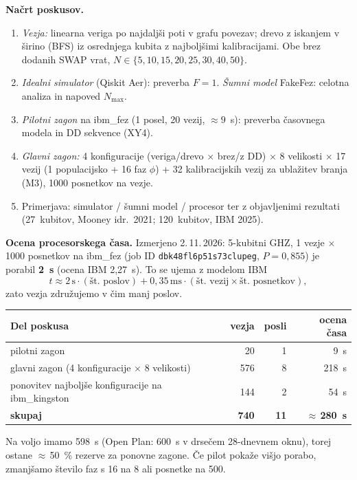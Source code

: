 \documentclass[10pt,a4paper]{article}
\begin{document}
\textbf{Načrt poskusov.}
\begin{enumerate}
\item \emph{Vezja:} linearna veriga po najdaljši poti v grafu povezav; drevo z iskanjem v širino (BFS) iz osrednjega kubita
      z najboljšimi kalibracijami. Obe brez dodanih SWAP vrat, $N\in\{5,10,15,20,25,30,40,50\}$.
\item \emph{Idealni simulator} (Qiskit Aer): preverba $F=1$. \emph{Šumni model} FakeFez: celotna analiza in napoved $N_{\max}$.
\item \emph{Pilotni zagon} na ibm\_fez (1 posel, 20 vezij, $\approx 9$~s): preverba časovnega modela in DD sekvence (XY4).
\item \emph{Glavni zagon:} 4 konfiguracije (veriga/drevo $\times$ brez/z DD) $\times$ 8 velikosti $\times$ 17 vezij
      (1 populacijsko + 16 faz $\phi$) + 32 kalibracijskih vezij za ublažitev branja (M3), 1000 posnetkov na vezje.
\item Primerjava: simulator / šumni model / procesor ter z objavljenimi rezultati (27~kubitov, Mooney idr.\ 2021; 120~kubitov, IBM 2025).
\end{enumerate}

\textbf{Ocena procesorskega časa.} Izmerjeno 2.\,11.\,2026: 5-kubitni GHZ, 1 vezje $\times$ 1000 posnetkov na ibm\_fez
(job ID \texttt{dbk48fl6p51s73clupeg}, $P=0{,}855$) je porabil \textbf{2~s} (ocena IBM 2,27~s). To se ujema z modelom IBM
\[ t \approx 2\,\mathrm{s}\cdot(\text{št.\ poslov}) + 0{,}35\,\mathrm{ms}\cdot(\text{št.\ vezij}\times\text{št.\ posnetkov}), \]
zato vezja združujemo v čim manj poslov.
\begin{center}\small
\begin{tabular}{lrrr}
\toprule
Del poskusa & vezja & posli & ocena časa \\
\midrule
pilotni zagon & 20 & 1 & 9~s \\
glavni zagon (4 konfiguracije $\times$ 8 velikosti) & 576 & 8 & 218~s \\
ponovitev najboljše konfiguracije na ibm\_kingston & 144 & 2 & 54~s \\
\midrule
\textbf{skupaj} & \textbf{740} & \textbf{11} & \textbf{$\approx$\,280~s} \\
\bottomrule
\end{tabular}
\end{center}
Na voljo imamo 598~s (Open Plan: 600~s v drsečem 28-dnevnem oknu), torej ostane $\approx$\,50~\% rezerve za ponovne zagone.
Če pilot pokaže višjo porabo, zmanjšamo število faz s 16 na 8 ali posnetke na 500.
\end{document}

